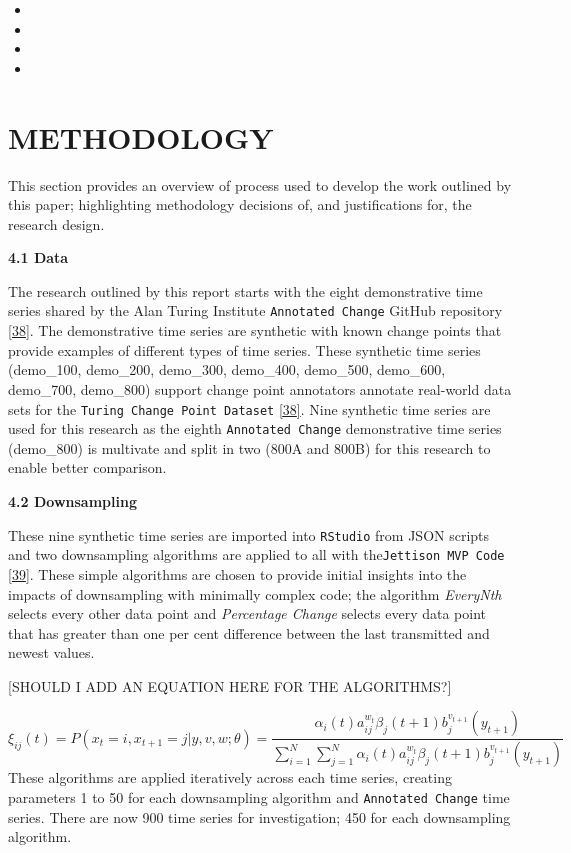 \documentclass{article}
\providecommand{\tightlist}{%
  \setlength{\itemsep}{0pt}\setlength{\parskip}{0pt}}
\begin{document}
\begin{itemize}
\tightlist
\item
\item
\item
\item
\end{itemize}

\hypertarget{methodology}{%
\section{METHODOLOGY}\label{methodology}}

This section provides an overview of process used to develop the work
outlined by this paper; highlighting methodology decisions of, and
justifications for, the research design.

\textbf{4.1 Data}

The research outlined by this report starts with the eight demonstrative
time series shared by the Alan Turing Institute
\texttt{Annotated\ Change} GitHub repository
\protect\hyperlink{ref-ATIChangePoint}{{[}38{]}}. The demonstrative time
series are synthetic with known change points that provide examples of
different types of time series. These synthetic time series (demo\_100,
demo\_200, demo\_300, demo\_400, demo\_500, demo\_600, demo\_700,
demo\_800) support change point annotators annotate real-world data sets
for the \texttt{Turing\ Change\ Point\ Dataset}
\protect\hyperlink{ref-ATIChangePoint}{{[}38{]}}. Nine synthetic time
series are used for this research as the eighth
\texttt{Annotated\ Change} demonstrative time series (demo\_800) is
multivate and split in two (800A and 800B) for this research to enable
better comparison.

\textbf{4.2 Downsampling}

These nine synthetic time series are imported into \texttt{RStudio} from
JSON scripts and two downsampling algorithms are applied to all with
the\texttt{Jettison\ MVP\ Code}
\protect\hyperlink{ref-Jettison}{{[}39{]}}. These simple algorithms are
chosen to provide initial insights into the impacts of downsampling with
minimally complex code; the algorithm \emph{EveryNth} selects every
other data point and \emph{Percentage Change} selects every data point
that has greater than one per cent difference between the last
transmitted and newest values.

{[}SHOULD I ADD AN EQUATION HERE FOR THE ALGORITHMS?{]}

\[
\xi _{ij}(t)=P(x_{t}=i,x_{t+1}=j|y,v,w;\theta)= {\frac {\alpha _{i}(t)a^{w_t}_{ij}\beta _{j}(t+1)b^{v_{t+1}}_{j}(y_{t+1})}{\sum _{i=1}^{N} \sum _{j=1}^{N} \alpha _{i}(t)a^{w_t}_{ij}\beta _{j}(t+1)b^{v_{t+1}}_{j}(y_{t+1})}}
\] These algorithms are applied iteratively across each time series,
creating parameters 1 to 50 for each downsampling algorithm and
\texttt{Annotated\ Change} time series. There are now 900 time series
for investigation; 450 for each downsampling algorithm.
\end{document}
